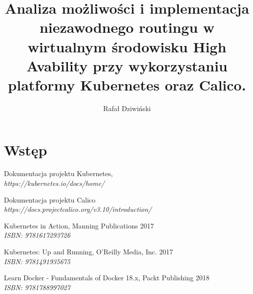 \documentclass[pl,final]{mgr} %
\author{Rafał Dziwiński}
\title{Analiza możliwości i implementacja niezawodnego routingu w wirtualnym środowisku High Avability przy wykorzystaniu platformy Kubernetes oraz Calico.}
\begin{document}
\maketitle
\tableofcontents

\chapter{Wstęp}








\begin{thebibliography}{99}
	Dokumentacja projektu Kubernetes,
	\\ \textit{https://kubernetes.io/docs/home/}
	
	Dokumentacja projektu Calico \\
	\textit{https://docs.projectcalico.org/v3.10/introduction/}

	Kubernetes in Action, Manning Publications 2017 \\
	\textit{ISBN: 9781617293726}
	
	Kubernetes: Up and Running, O'Reilly Media, Inc. 2017 \\
	\textit{ISBN: 9781491935675}
	
	Learn Docker - Fundamentals of Docker 18.x, Packt Publishing 2018\\
	\textit{ISBN: 9781788997027}

\end{thebibliography}
\end{document}
